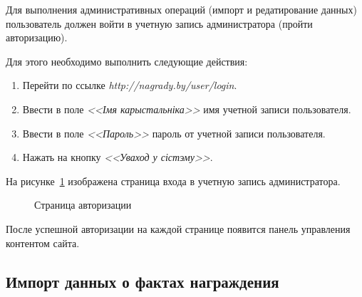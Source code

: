 Для выполнения административных операций 
(импорт и редатирование данных)
пользователь должен войти в учетную запись администратора
(пройти авторизацию).

Для этого необходимо выполнить следующие действия:
\begin{enumerate}
\item Перейти по ссылке \textit{http://nagrady.by/user/login}.
\item Ввести в поле \textit{<<Імя карыстальніка>>} имя учетной записи пользователя.
\item Ввести в поле \textit{<<Пароль>>} пароль от учетной записи пользователя. 
\item Нажать на кнопку \textit{<<Уваход у сістэму>>}.
\end{enumerate}

На рисунке~\ref{fig:login_page} изображена страница входа в учетную запись администратора.

\begin{figure}[h]
  \centering
  {
    \setlength{\fboxsep}{0pt}%
    \setlength{\fboxrule}{1pt}%
  }
  \caption{Страница авторизации}
  \label{fig:login_page}
\end{figure}

После успешной авторизации на каждой странице появится панель управления контентом сайта. 

\subsection{Импорт данных о фактах награждения}
\label{ssec:help_import_awarded}

